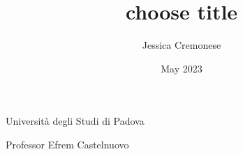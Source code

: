 \documentclass[12pt,a4paper,draft]{article}
\begin{document}
\begin{titlepage}
\title{choose title}
\author{Jessica Cremonese}
\date{May 2023}
\maketitle

\vspace{10cm}


Università degli Studi di Padova 

Professor Efrem Castelnuovo

\end{titlepage}
\end{document}

